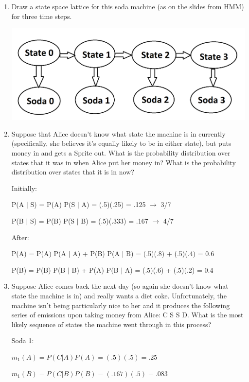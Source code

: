 \documentclass[fleqn]{hermans-hw}
\begin{document}
\begin{enumerate}
\item Draw a state space lattice for this soda machine (as on the slides from HMM) for three time steps.

\includegraphics[scale=0.8]{state-lattice.png}

\item Suppose that Alice doesn't know what state the machine is in
  currently (specifically, she believes it's equally likely to be in
  either state), but puts money in and gets a Sprite out.  What is the
  probability distribution over states that it was in when Alice put
  her money in?  What is the probability distribution over states that
  it is in now?
  
  Initially:
  
  P(A $|$ S) = P(A) P(S $|$ A) = (.5)(.25) = .125 $\rightarrow$ 3/7
  
  P(B $|$ S) = P(B) P(S $|$ B) = (.5)(.333) = .167 $\rightarrow$ 4/7
  
  After:
  
  P(A) = P(A) P(A $|$ A) + P(B) P(A $|$ B) = (.5)(.8) + (.5)(.4) = 0.6
  
  P(B) = P(B) P(B $|$ B) + P(A) P(B $|$ A) = (.5)(.6) + (.5)(.2) = 0.4

\item Suppose Alice comes back the next day (so again she doesn't know
  what state the machine is in) and really wants a diet coke.
  Unfortunately, the machine isn't being particularly nice to her and
  it produces the following series of emissions upon taking money from
  Alice: C S S D.  What is the most likely sequence of states the
  machine went through in this process?
  
	Soda 1:
	
	$m_1(A) = P(C|A) P(A) = (.5)(.5) = .25$

	$m_1(B) = P(C|B) P(B) = (.167)(.5) = .083$
	
	\bigbreak
	

\end{enumerate}
\end{document}
